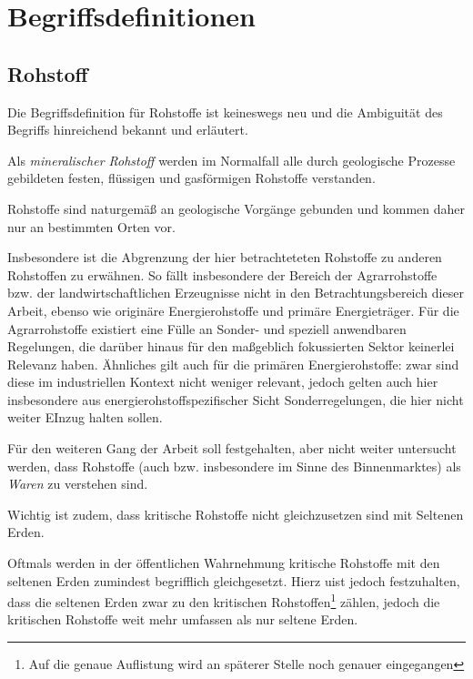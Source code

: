 \documentclass[12pt,a4paper,oneside]{book} %
\begin{document}
	\section{Begriffsdefinitionen}
	
	\subsection{Rohstoff}
	
Die Begriffsdefinition für Rohstoffe ist keineswegs neu und die Ambiguität des Begriffs hinreichend bekannt und erläutert.

Als \textit{mineralischer Rohstoff} werden im Normalfall \glqq alle durch geologische Prozesse gebildeten festen, flüssigen und gasförmigen Rohstoffe verstanden\grqq.\autocite{Frenz 2025, 67}
	
Rohstoffe sind naturgemäß an geologische Vorgänge gebunden und kommen daher nur an bestimmten Orten vor.\autocite{Frenz 2025, S. 64}
	
 Insbesondere ist die Abgrenzung der hier betrachteteten Rohstoffe zu anderen Rohstoffen zu erwähnen. So fällt insbesondere der Bereich der Agrarrohstoffe bzw. der landwirtschaftlichen Erzeugnisse nicht in den Betrachtungsbereich dieser Arbeit, ebenso wie originäre Energierohstoffe und primäre Energieträger. Für die Agrarrohstoffe existiert eine Fülle an Sonder- und speziell anwendbaren Regelungen, die darüber hinaus für den maßgeblich fokussierten Sektor keinerlei Relevanz haben. Ähnliches gilt auch für die primären Energierohstoffe: zwar sind diese im industriellen Kontext nicht weniger relevant, jedoch gelten auch hier insbesondere aus energierohstoffspezifischer Sicht Sonderregelungen, die hier nicht weiter EInzug halten sollen.
	
	
	Für den weiteren Gang der Arbeit soll festgehalten, aber nicht weiter untersucht werden, dass Rohstoffe (auch bzw. insbesondere im Sinne des Binnenmarktes) als \textit{Waren} zu verstehen sind.\autocite{Schorkopf, Rohstoffverwaltung, Rn. 6ff.}
	
	Wichtig ist zudem, dass kritische Rohstoffe nicht gleichzusetzen sind mit Seltenen Erden. 
	
	Oftmals werden in der öffentlichen Wahrnehmung kritische Rohstoffe mit den seltenen Erden zumindest begrifflich gleichgesetzt. Hierz uist jedoch festzuhalten, dass die seltenen Erden zwar zu den kritischen Rohstoffen\footnote{Auf die genaue Auflistung wird an späterer Stelle noch genauer eingegangen} zählen, jedoch die kritischen Rohstoffe weit mehr umfassen als nur seltene Erden. 
	
\end{document}
